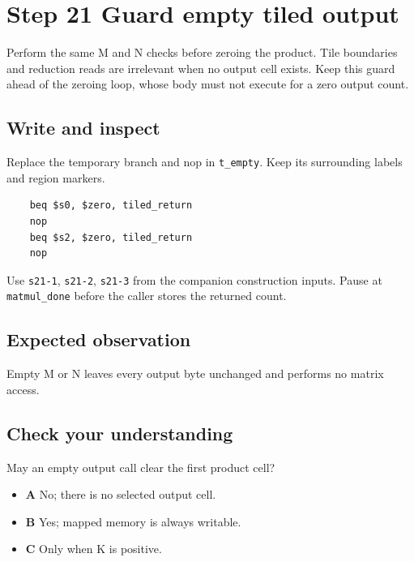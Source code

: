 \section{Step 21 Guard empty tiled output}\label{matmul-s21}

Perform the same M and N checks before zeroing the product. Tile boundaries and reduction reads are irrelevant when no output cell exists. Keep this guard ahead of the zeroing loop, whose body must not execute for a zero output count.

\subsection{Write and inspect}
Replace the temporary branch and nop in \texttt{t\_empty}. Keep its surrounding labels and region markers.

\begin{verbatim}
    beq $s0, $zero, tiled_return
    nop
    beq $s2, $zero, tiled_return
    nop
\end{verbatim}
Use \texttt{s21-1}, \texttt{s21-2}, \texttt{s21-3} from the companion construction inputs. Pause at \texttt{matmul\_done} before the caller stores the returned count.

\subsection{Expected observation}
Empty M or N leaves every output byte unchanged and performs no matrix access.

\subsection{Check your understanding}
May an empty output call clear the first product cell?

\begin{itemize}
\item \textbf{A} No; there is no selected output cell.
\item \textbf{B} Yes; mapped memory is always writable.
\item \textbf{C} Only when K is positive.
\end{itemize}
